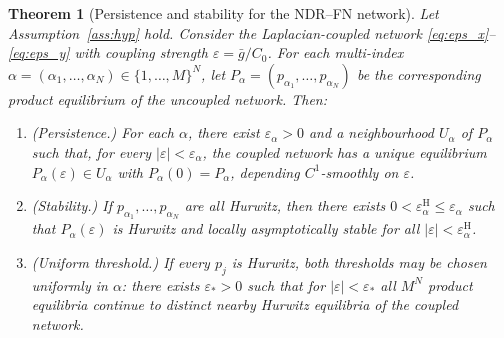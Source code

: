 \documentclass[11pt]{article}
\newtheorem{theorem}{Theorem}
\begin{document}
\begin{theorem}[Persistence and stability for the NDR--FN network]
  \label{thm:main}
  Let Assumption~\ref{ass:hyp} hold. Consider the Laplacian-coupled
  network \eqref{eq:eps_x}--\eqref{eq:eps_y} with coupling strength
  $\varepsilon = \bar{g}/C_0$. For each multi-index
  $\alpha = (\alpha_1,\ldots,\alpha_N)\in\{1,\ldots,M\}^N$, let
  $P_\alpha = (p_{\alpha_1},\ldots,p_{\alpha_N})$ be the corresponding
  product equilibrium of the uncoupled network. Then:

  \begin{enumerate}
    \item[\textup{(i)}] \textup{(Persistence.)}
    For each $\alpha$, there exist $\varepsilon_\alpha>0$ and a
    neighbourhood $U_\alpha$ of $P_\alpha$ such that, for every
    $|\varepsilon|<\varepsilon_\alpha$, the coupled network has a unique
    equilibrium $P_\alpha(\varepsilon)\in U_\alpha$ with
    $P_\alpha(0)=P_\alpha$, depending $C^1$-smoothly on $\varepsilon$.

    \item[\textup{(ii)}] \textup{(Stability.)}
    If $p_{\alpha_1},\ldots,p_{\alpha_N}$ are all Hurwitz, then there
    exists $0<\varepsilon_{\alpha}^{\mathrm{H}}\leq\varepsilon_\alpha$
    such that $P_\alpha(\varepsilon)$ is Hurwitz and locally
    asymptotically stable for all
    $|\varepsilon|<\varepsilon_{\alpha}^{\mathrm{H}}$.

    \item[\textup{(iii)}] \textup{(Uniform threshold.)}
    If every $p_j$ is Hurwitz, both thresholds may be chosen uniformly
    in $\alpha$: there exists $\varepsilon_*>0$ such that for
    $|\varepsilon|<\varepsilon_*$ all $M^N$ product equilibria continue
    to distinct nearby Hurwitz equilibria of the coupled network.
  \end{enumerate}
\end{theorem}
\end{document}
